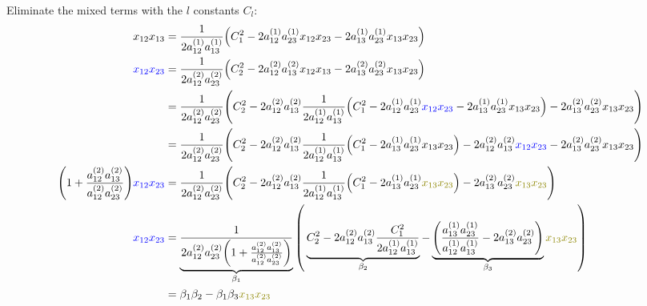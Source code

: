 \documentclass[
	english,
	a4paper,
	fontsize=10pt,
	parskip=half,
	titlepage=true,
	DIV=12,
	final
]{scrreprt}
\begin{document}
Eliminate the mixed terms with the $l$ constants $C_l$: \\
\begin{align}
	x_{12} x_{13}
&=
	\frac
		{1}
		{2 a^{(1)}_{12} a^{(1)}_{13}} \qty( \Big.
			C_1^2 -
			2 a^{(1)}_{12} a^{(1)}_{23} x_{12} x_{23} -
			2 a^{(1)}_{13} a^{(1)}_{23} x_{13} x_{23}
		)
\\
	{\color{blue} x_{12} x_{23}}
&=
	\frac
		{1}
		{2 a^{(2)}_{12} a^{(2)}_{23}} \qty( \Big.
			C_2^2 -
			2 a^{(2)}_{12} a^{(2)}_{13} x_{12} x_{13} -
			2 a^{(2)}_{13} a^{(2)}_{23} x_{13} x_{23}
		)
\\
&=
	\frac
		{1}
		{2 a^{(2)}_{12} a^{(2)}_{23}} \qty( \Big.
			C_2^2 -
			2 a^{(2)}_{12} a^{(2)}_{13} 
				\frac
						{1}
						{2 a^{(1)}_{12} a^{(1)}_{13}} \qty( \Big.
							C_1^2 -
							2 a^{(1)}_{12} a^{(1)}_{23} {\color{blue} x_{12} x_{23}} -
							2 a^{(1)}_{13} a^{(1)}_{23} x_{13} x_{23}
						)
			-
			2 a^{(2)}_{13} a^{(2)}_{23} x_{13} x_{23}
		)
\\
&=
	\frac
		{1}
		{2 a^{(2)}_{12} a^{(2)}_{23}} \qty( \Big.
			C_2^2 -
			2 a^{(2)}_{12} a^{(2)}_{13} 
				\frac
						{1}
						{2 a^{(1)}_{12} a^{(1)}_{13}} \qty( \Big.
							C_1^2 -
							2 a^{(1)}_{13} a^{(1)}_{23} x_{13} x_{23}
						)
			- 2 a^{(2)}_{12} a^{(2)}_{13} {\color{blue} x_{12} x_{23}}
			- 2 a^{(2)}_{13} a^{(2)}_{23} x_{13} x_{23}
	)
\\
	\qty(
		1 + 
		\frac
			{a^{(2)}_{12} a^{(2)}_{13}}
			{a^{(2)}_{12} a^{(2)}_{23}}
	) {\color{blue} x_{12} x_{23}}
&=
	\frac
		{1}
		{2 a^{(2)}_{12} a^{(2)}_{23}} \qty( \Big.
			C_2^2 -
			2 a^{(2)}_{12} a^{(2)}_{13} 
				\frac
						{1}
						{2 a^{(1)}_{12} a^{(1)}_{13}} \qty( \Big.
							C_1^2 -
							2 a^{(1)}_{13} a^{(1)}_{23} {\color{olive} x_{13} x_{23}}
						)
			- 2 a^{(2)}_{13} a^{(2)}_{23} {\color{olive} x_{13} x_{23}}
	)
\\
	{\color{blue} x_{12} x_{23}}
&=
	\underbrace{	\frac
		{1}
		{2 a^{(2)}_{12} a^{(2)}_{23}
			\qty(
				1 +
				\frac 
				  {a^{(2)}_{12} a^{(2)}_{13}}
					{a^{(2)}_{12} a^{(2)}_{23}}
			)
		}}_{\beta_1}
	\qty( \Big.
		\underbrace{
			C_2^2 -
			2 a^{(2)}_{12} a^{(2)}_{13} 
				\frac
					{C_1^2}
					{2 a^{(1)}_{12} a^{(1)}_{13}} 
		}_{\beta_2}
			-
			\underbrace{\qty( \Big.
				\frac
					{a^{(1)}_{13} a^{(1)}_{23}}
					{a^{(1)}_{12} a^{(1)}_{13}} 
				- 2 a^{(2)}_{13} a^{(2)}_{23}
			)}_{\beta_3}
		{\color{olive} x_{13} x_{23}}
	) \\
&=
	\beta_1 \beta_2 - \beta_1 \beta_3 {\color{olive} x_{13} x_{23}}
\end{align}
\end{document}

